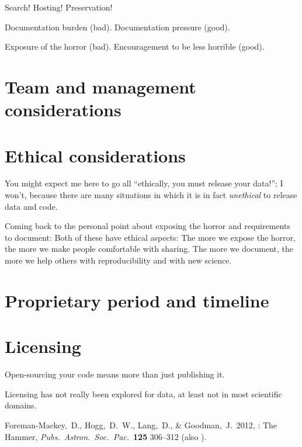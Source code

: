 \documentclass[12pt,twoside,pdftex]{article}
\begin{document}
Search! Hosting! Preservation!

Documentation burden (bad). Documentation pressure (good).

Exposure of the horror (bad). Encouragement to be less horrible (good).

\section{Team and management considerations}

\section{Ethical considerations}

You might expect me here to go all ``ethically, you must release your
data!''; I won't, because there are many situations in which it is in
fact \emph{unethical} to release data and code.

Coming back to the personal point about exposing the horror and
requirements to document: Both of these have ethical aspects: The more
we expose the horror, the more we make people comfortable with
sharing. The more we document, the more we help others with
reproducibility and with new science.

\section{Proprietary period and timeline}

\section{Licensing}

Open-sourcing your code means more than just publishing it.

Licensing has not really been explored for data, at least not in most
scientific domains.

\clearpage
{}\theendnotes

\clearpage
\raggedright
\begin{thebibliography}{}
  Foreman-Mackey,~D., Hogg,~D.~W., Lang,~D., \& Goodman,~J.\ 2012,
  : The  Hammer,
  \textit{Pubs.\ Astron.\ Soc.\ Pac.}\ \textbf{125} 306--312
  (also ).
\end{thebibliography}
\end{document}
